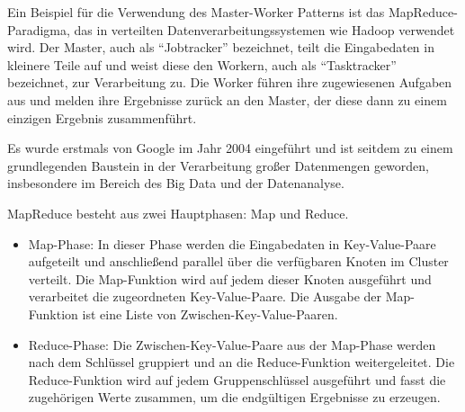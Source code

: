 Ein Beispiel für die Verwendung des Master-Worker Patterns ist das MapReduce-Paradigma, das in verteilten Datenverarbeitungssystemen wie Hadoop verwendet wird. Der Master, auch als \enquote{Jobtracker} bezeichnet, teilt die Eingabedaten in kleinere Teile auf und weist diese den Workern, auch als \enquote{Tasktracker} bezeichnet, zur Verarbeitung zu. Die Worker führen ihre zugewiesenen Aufgaben aus und melden ihre Ergebnisse zurück an den Master, der diese dann zu einem einzigen Ergebnis zusammenführt.

Es wurde erstmals von Google im Jahr 2004 eingeführt und ist seitdem zu einem grundlegenden Baustein in der Verarbeitung großer Datenmengen geworden, insbesondere im Bereich des Big Data und der Datenanalyse.

MapReduce besteht aus zwei Hauptphasen: Map und Reduce.
\begin{itemize}  
\item Map-Phase: In dieser Phase werden die Eingabedaten in Key-Value-Paare aufgeteilt und anschließend parallel über die verfügbaren Knoten im Cluster verteilt. Die Map-Funktion wird auf jedem dieser Knoten ausgeführt und verarbeitet die zugeordneten Key-Value-Paare. Die Ausgabe der Map-Funktion ist eine Liste von Zwischen-Key-Value-Paaren.
\item Reduce-Phase: Die Zwischen-Key-Value-Paare aus der Map-Phase werden nach dem Schlüssel gruppiert und an die Reduce-Funktion weitergeleitet. Die Reduce-Funktion wird auf jedem Gruppenschlüssel ausgeführt und fasst die zugehörigen Werte zusammen, um die endgültigen Ergebnisse zu erzeugen.
\end{itemize}  

